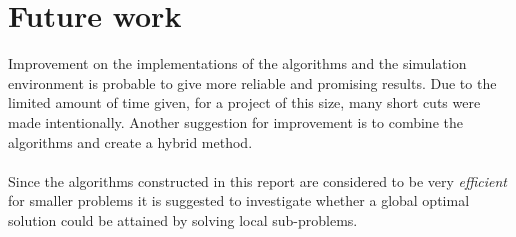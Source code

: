 
\section{Future work}
Improvement on the implementations of the algorithms and the simulation environment is probable to give more reliable and promising results. Due to the limited amount of time given, for a project of this size, many short cuts were made intentionally. Another suggestion for improvement is to combine the algorithms and create a hybrid method. \\
\\Since the algorithms constructed in this report are considered to be very \emph{efficient} for smaller problems it is suggested to investigate whether a global optimal solution could be attained by solving local sub-problems.